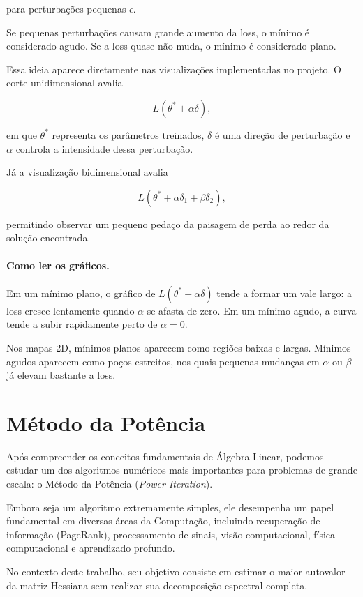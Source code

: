 \documentclass[12pt, a4paper]{article}
\begin{document}
para perturbações pequenas \(\epsilon\).

Se pequenas perturbações causam grande aumento da loss, o mínimo é considerado
agudo. Se a loss quase não muda, o mínimo é considerado plano.

Essa ideia aparece diretamente nas visualizações implementadas no projeto. O
corte unidimensional avalia

\[
L(\theta^{*} + \alpha \delta),
\]

em que \(\theta^{*}\) representa os parâmetros treinados, \(\delta\) é uma
direção de perturbação e \(\alpha\) controla a intensidade dessa perturbação.

Já a visualização bidimensional avalia

\[
L(\theta^{*} + \alpha \delta_1 + \beta \delta_2),
\]

permitindo observar um pequeno pedaço da paisagem de perda ao redor da solução
encontrada.

\paragraph{Como ler os gráficos.}

Em um mínimo plano, o gráfico de \(L(\theta^{*}+\alpha\delta)\) tende a formar
um vale largo: a loss cresce lentamente quando \(\alpha\) se afasta de zero.
Em um mínimo agudo, a curva tende a subir rapidamente perto de \(\alpha=0\).

Nos mapas 2D, mínimos planos aparecem como regiões baixas e largas. Mínimos
agudos aparecem como poços estreitos, nos quais pequenas mudanças em
\(\alpha\) ou \(\beta\) já elevam bastante a loss.

\section{Método da Potência}

Após compreender os conceitos fundamentais de Álgebra Linear, podemos estudar um dos algoritmos numéricos mais importantes para problemas de grande escala: o Método da Potência (\textit{Power Iteration}).

Embora seja um algoritmo extremamente simples, ele desempenha um papel fundamental em diversas áreas da Computação, incluindo recuperação de informação (PageRank), processamento de sinais, visão computacional, física computacional e aprendizado profundo.

No contexto deste trabalho, seu objetivo consiste em estimar o maior autovalor da matriz Hessiana sem realizar sua decomposição espectral completa.
\end{document}
